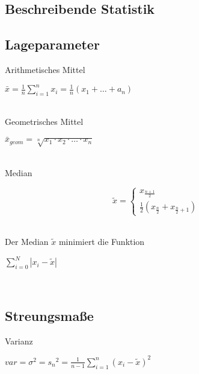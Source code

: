 \documentclass[10pt,a4paper,landscape]{article}
\begin{document}
\begin{multicols*}{4}
\section{Beschreibende Statistik}
\subsection{Lageparameter}
Arithmetisches Mittel \\
\parbox{\columnwidth}{\centering$\bar{x}=\frac{1}{n}\sum \limits_{i=1}^n x_i=\frac{1}{n}(x_1 + \dots + a_n)$}\\

Geometrisches Mittel \\
\parbox{\columnwidth}{\centering$\bar{x}_{geom} = \sqrt[n]{x_1 \cdot x_2 \cdot \dots \cdot x_n}$}\\

Median \\
\parbox{\columnwidth}{\centering\[\tilde{x}=\begin{cases}x_{\frac{n+1}{2}}\\\frac{1}{2}(x_{\frac{n}{2}}+x_{\frac{n}{2}+1})\end{cases}\]}\\

Der Median $\tilde{x}$ minimiert die Funktion \\
\parbox{\columnwidth}{\centering$\sum_{i=0}^N|x_i-\tilde{x}|$}\\

\subsection{Streungsmaße}
Varianz \\
\parbox{\columnwidth}{\centering$var = \sigma^2 = {s_n}^2 = \frac{1}{n-1} \sum_{i=1}^n(x_i-\tilde{x})^2$}\\

\end{multicols*}
\end{document}
